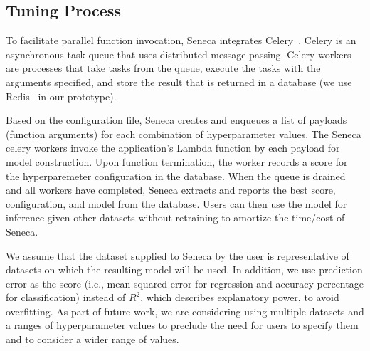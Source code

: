 \subsection{Tuning Process}

To facilitate parallel function invocation, Seneca integrates 
Celery~\cite{ref:celery}.
Celery is an asynchronous task queue 
that uses distributed message passing. Celery workers are processes 
that take tasks from the queue, execute the tasks with the arguments specified, 
and store the result that is returned 
in a database (we use Redis~\cite{ref:redis}
in our prototype). 

Based on the configuration file, Seneca creates and enqueues a list of 
payloads (function arguments) for each combination of hyperparameter values.  
The Seneca celery workers invoke the application's Lambda function by each payload for model construction. Upon function termination, the worker records a score for the hyperparemeter configuration
in the database.  When the queue is drained and all workers have completed, Seneca extracts and reports the best score, configuration, and model from the database. Users can then use the model for inference given other datasets without retraining to amortize the time/cost of Seneca.


We assume that the dataset supplied to Seneca by the user is representative of 
datasets on which the 
resulting model will be used.  In addition, we use prediction error as the 
score (i.e., mean squared error for regression and accuracy percentage for classification) 
instead of $R^2$, which describes explanatory power, to avoid overfitting.
As part of future work, we are considering using multiple datasets and a ranges
of hyperparameter values to preclude the need for users to specify
them and to consider a wider range of values.
